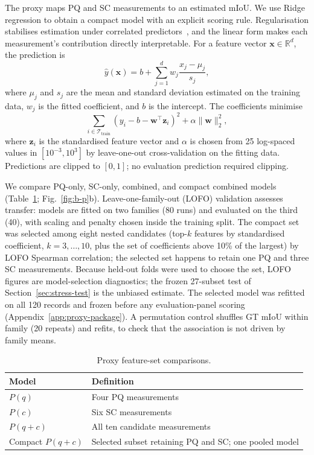 \documentclass[a4paper,fleqn]{cas-dc}
\begin{document}
The proxy maps PQ and SC measurements to an estimated mIoU. We use Ridge regression to obtain a compact model with an explicit scoring rule. Regularisation stabilises estimation under correlated predictors~\cite{hoerl1970ridge,pedregosa2011sklearn}, and the linear form makes each measurement's contribution directly interpretable. For a feature vector $\mathbf{x}\in\mathbb{R}^{d}$, the prediction is
\begin{equation}
\hat{y}(\mathbf{x})
=
b+\sum_{j=1}^{d}
w_j\frac{x_j-\mu_j}{s_j},
\label{eq:ridge-proxy}
\end{equation}
where $\mu_j$ and $s_j$ are the mean and standard deviation estimated on the training data, $w_j$ is the fitted coefficient, and $b$ is the intercept. The coefficients minimise
\begin{equation}
\sum_{i\in\mathcal{T}_{\mathrm{train}}}
\left(y_i-b-\mathbf{w}^{\top}\mathbf{z}_i\right)^2
+\alpha\|\mathbf{w}\|_2^2,
\label{eq:ridge-objective}
\end{equation}
where $\mathbf{z}_i$ is the standardised feature vector and $\alpha$ is chosen from 25 log-spaced values in $[10^{-3},10^{3}]$ by leave-one-out cross-validation on the fitting data. Predictions are clipped to $[0,1]$; no evaluation prediction required clipping.

We compare PQ-only, SC-only, combined, and compact combined models (Table~\ref{tab:proxy-ablation}; Fig.~\ref{fig:b-p}b). Leave-one-family-out (LOFO) validation assesses transfer: models are fitted on two families (80 runs) and evaluated on the third (40), with scaling and penalty chosen inside the training split. The compact set was selected among eight nested candidates (top-$k$ features by standardised coefficient, $k=3,\ldots,10$, plus the set of coefficients above 10\% of the largest) by LOFO Spearman correlation; the selected set happens to retain one PQ and three SC measurements. Because held-out folds were used to choose the set, LOFO figures are model-selection diagnostics; the frozen 27-subset test of Section~\ref{sec:stress-test} is the unbiased estimate. The selected model was refitted on all 120 records and frozen before any evaluation-panel scoring (Appendix~\ref{app:proxy-package}). A permutation control shuffles GT mIoU within family (20 repeats) and refits, to check that the association is not driven by family means.

\begin{table}[ht]
\caption{Proxy feature-set comparisons.}
\label{tab:proxy-ablation}
\centering
\begin{tabular}{p{} p{}}
\toprule
Model & Definition \\
\midrule
$P(q)$ & Four PQ measurements \\
$P(c)$ & Six SC measurements \\
$P(q{+}c)$ & All ten candidate measurements \\
Compact $P(q{+}c)$ & Selected subset retaining PQ and SC; one pooled model \\
\bottomrule
\end{tabular}
\end{table}
\end{document}
